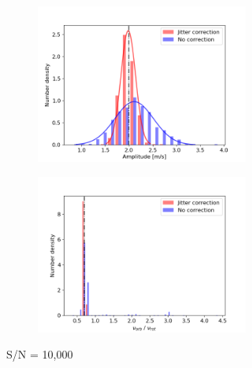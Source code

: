 \begin{figure}[tbp]	
    \begin{subfigure}[b]{1.0\textwidth}
    		\begin{subfigure}[b]{0.49\textwidth}
        		\includegraphics[width=\textwidth]{./Figures/Methods/Histogram_new1_p2_sn10000.png}
        \end{subfigure}
        \begin{subfigure}[b]{0.49\textwidth}
        		\includegraphics[width=\textwidth]{./Figures/Methods/Histogram_new2_p2_sn10000.png}
        \end{subfigure}
        \caption{S/N = 10,000}
    \end{subfigure}
    \begin{subfigure}[b]{1.0\textwidth}

\end{subfigure}
\end{figure}
